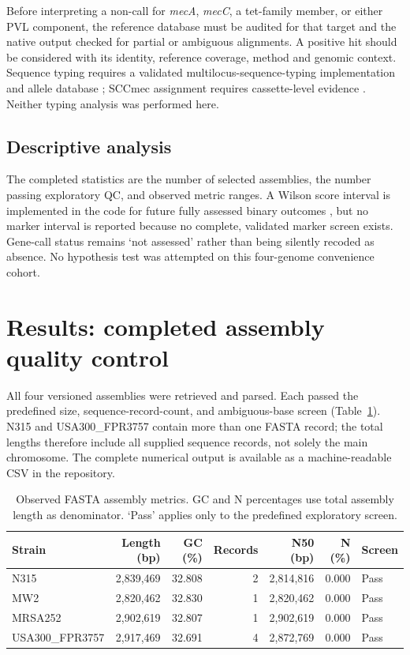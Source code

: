 \documentclass[11pt,a4paper]{article}
\begin{document}
Before interpreting a non-call for \textit{mecA}, \textit{mecC}, a tet-family member, or either PVL component, the reference database must be audited for that target and the native output checked for partial or ambiguous alignments. A positive hit should be considered with its identity, reference coverage, method and genomic context. Sequence typing requires a validated multilocus-sequence-typing implementation and allele database \cite{Enright2000}; SCCmec assignment requires cassette-level evidence \cite{IWGSCC2009}. Neither typing analysis was performed here.

\subsection{Descriptive analysis}
The completed statistics are the number of selected assemblies, the number passing exploratory QC, and observed metric ranges. A Wilson score interval is implemented in the code for future fully assessed binary outcomes \cite{Wilson1927}, but no marker interval is reported because no complete, validated marker screen exists. Gene-call status remains `not assessed' rather than being silently recoded as absence. No hypothesis test was attempted on this four-genome convenience cohort.

\section{Results: completed assembly quality control}
All four versioned assemblies were retrieved and parsed. Each passed the predefined size, sequence-record-count, and ambiguous-base screen (Table~\ref{tab:qc}). N315 and USA300\_FPR3757 contain more than one FASTA record; the total lengths therefore include all supplied sequence records, not solely the main chromosome. The complete numerical output is available as a machine-readable CSV in the repository.

\begin{table}[htbp]
\centering\small
\caption{Observed FASTA assembly metrics. GC and N percentages use total assembly length as denominator. `Pass' applies only to the predefined exploratory screen.}
\begin{tabular}{@{}lrrrrrl@{}}\toprule
Strain & Length (bp) & GC (\%) & Records & N50 (bp) & N (\%) & Screen\\\midrule
N315 & 2,839,469 & 32.808 & 2 & 2,814,816 & 0.000 & Pass\\
MW2 & 2,820,462 & 32.830 & 1 & 2,820,462 & 0.000 & Pass\\
MRSA252 & 2,902,619 & 32.807 & 1 & 2,902,619 & 0.000 & Pass\\
USA300\_FPR3757 & 2,917,469 & 32.691 & 4 & 2,872,769 & 0.000 & Pass\\\bottomrule
\end{tabular}
\label{tab:qc}
\end{table}
\end{document}
